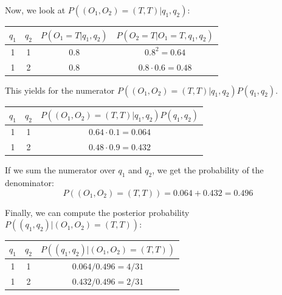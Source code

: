 Now, we look at $ P((O_1, O_2) = (T, T) | q_1, q_2)$:

\begin{center}
\begin{tabular}{c | c | c | c }
    $q_1$ & $q_2$ & $P(O_1 = T | q_1, q_2)$ & $P(O_2 = T | O_1 = T , q_1, q_2)$ \\ \hline
    1       & 1   & 0.8 & $0.8^2 = 0.64 $\\
    1       & 2   & 0.8 & $0.8 \cdot 0.6 = 0.48$  \\
\end{tabular}
\end{center}

This yields for the numerator $P((O_1, O_2) = (T, T) | q_1, q_2) P(q_1, q_2)$.

\begin{center}
\begin{tabular}{c | c | c }
    $q_1$ & $q_2$ & $P((O_1, O_2) = (T, T) | q_1, q_2) P(q_1, q_2) $ \\ \hline
    1       & 1   & $0.64 \cdot 0.1 = 0.064 $\\
    1       & 2   & $0.48 \cdot 0.9 = 0.432 $  \\
\end{tabular}
\end{center}

If we sum the numerator over $q_1$ and $q_2$, we get the probability of the denominator:
\begin{equation}
    P((O_1, O_2) = (T, T)) = 0.064 + 0.432 = 0.496
\end{equation}

Finally, we can compute the posterior probability $P((q_1, q_2 )| (O_1, O_2) = (T, T))$:
\begin{center}
\begin{tabular}{c | c | c }
    $q_1$ & $q_2$ & $P((q_1, q_2 )| (O_1, O_2) = (T, T))$ \\ \hline
    1       & 1   & $ 0.064 / 0.496 = 4 / 31 $\\
    1       & 2   & $ 0.432 / 0.496 = 2 / 31$ \\
\end{tabular}
\end{center}

